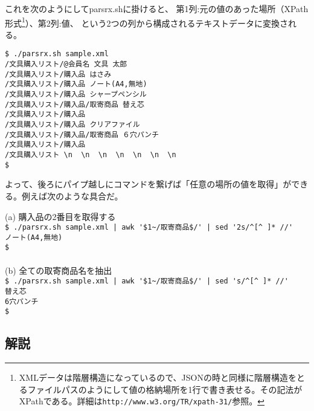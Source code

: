 これを次のようにしてparsrx.shに掛けると、
第1列:元の値のあった場所（XPath形式\footnote{XMLデータは階層構造になっているので、JSONの時と同様に階層構造をとるファイルパスのようにして値の格納場所を1行で書き表せる。その記法がXPathである。詳細は\verb|http://www.w3.org/TR/xpath-31/|参照。}）、第2列:値、
という2つの列から構成されるテキストデータに変換される。
\begin{screen}
	\verb|$ ./parsrx.sh sample.xml| \return \\
	\verb|/文具購入リスト/@会員名 文具 太郎| \\
	\verb|/文具購入リスト/購入品 はさみ| \\
	\verb|/文具購入リスト/購入品 ノート(A4,無地)| \\
	\verb|/文具購入リスト/購入品 シャープペンシル| \\
	\verb|/文具購入リスト/購入品/取寄商品 替え芯| \\
	\verb|/文具購入リスト/購入品| \\
	\verb|/文具購入リスト/購入品 クリアファイル| \\
	\verb|/文具購入リスト/購入品/取寄商品 ６穴パンチ| \\
	\verb|/文具購入リスト/購入品| \\
	\verb|/文具購入リスト \n  \n  \n  \n  \n  \n  \n| \\
	\verb|$ |
\end{screen}

よって、後ろにパイプ越しにコマンドを繋げば「任意の場所の値を取得」ができる。例えば次のような具合だ。
\begin{screen}
	(a) 購入品の2番目を取得する \\
	\verb!$ ./parsrx.sh sample.xml | awk '$1~/取寄商品$/' | sed '2s/^[^ ]* //'! \return \\
	\verb|ノート(A4,無地)| \\
	\verb|$ | \\
	\\
	(b) 全ての取寄商品名を抽出 \\
	\verb!$ ./parsrx.sh sample.xml | awk '$1~/取寄商品$/' | sed 's/^[^ ]* //'! \return \\
	\verb|替え芯| \\
	\verb|6穴パンチ| \\
	\verb|$ |
\end{screen}

\subsection*{解説}

